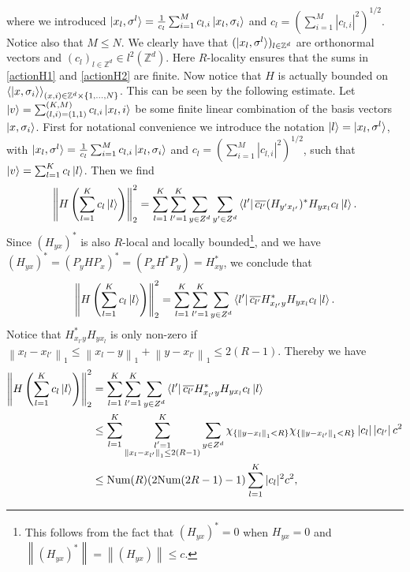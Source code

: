 \documentclass[a4paper,11pt]{article}
\newcommand{\norm}[1]{\left\lVert #1 \right\rVert}
\newcommand{\abs}[1]{\left\lvert #1 \right\rvert}
\newcommand{\Z}{\mathbb{Z}}
\numberwithin{equation}{section}
\begin{document}
 	 where we introduced $ \ket{x_l,\sigma^l}=\frac{1}{c_l}\sum_{i=1}^{M}c_{l,i}\ket{x_l,\sigma_i} $ and $ c_l=(\sum_{i=1}^{M}\abs{c_{l,i}}^2)^{1/2} $. Notice also that $ M\leq N $. We clearly have that $ (\ket{x_l,\sigma^l})_{l\in\Z^d} $ are orthonormal vectors and $ (c_l)_{l\in\Z^d}\in l^2(\Z^d) $. Here $ R $-locality ensures that the sums in \eqref{actionH1} and \eqref{actionH2} are finite. Now notice that $ H $ is actually bounded on $ \braket{\ket{x,\sigma_i}}_{(x,i)\in\Z^d\times\{1,...,N\}}  $. This can be seen by the following estimate. Let $ \ket{v}=\sum_{(l,i)=(1,1)}^{(K,M)}c_{l,i}\ket{x_l,i} $ be some finite linear combination of the basis vectors $ \ket{x,\sigma_i} $. First for notational convenience we introduce the notation $ \ket{l}=\ket{x_l,\sigma^l}$, with $\ket{x_l,\sigma^l}=\frac{1}{c_l}\sum_{i=1}^{M}c_{l,i}\ket{x_l,\sigma_i} $ and $ c_l=(\sum_{i=1}^{M}\abs{c_{l,i}}^2)^{1/2} $, such that $ \ket{v}=\sum_{l=1}^{K}c_l\ket{l} $. Then we find \begin{equation}
 	 \norm{H\left(\sum_{l=1}^{K}c_l\ket{l}\right)}_2^2=\sum_{l=1}^{K}\sum_{l'=1}^{K}\sum_{y\in Z^d}\sum_{y'\in Z^d}\bra{l'}\overline{c_{l'}}(H_{y'x_{l'}})^*H_{yx_l}c_l\ket{l}.
 	 \end{equation}
 	 Since $ (H_{yx})^* $ is also $ R $-local and locally bounded\footnote{This follows from the fact that $ (H_{yx})^*=0 $ when $ H_{yx}=0 $ and $ \norm{(H_{yx})^*}=\norm{(H_{yx})}\leq c $. }, and we have $ (H_{yx})^*=(P_yHP_x)^*=(P_xH^*P_y)=H^*_{xy} $, we conclude that \begin{equation}
 	  \norm{H\left(\sum_{l=1}^{K}c_l\ket{l}\right)}_2^2=\sum_{l=1}^{K}\sum_{l'=1}^{K}\sum_{y\in Z^d}\bra{l'}\overline{c_{l'}}H^*_{x_{l'}y}H_{yx_l}c_l\ket{l}.
 	 \end{equation}
 	 Notice that $ H^*_{x_{l'}y}H_{yx_l} $ is only non-zero if $ \norm{x_l-x_{l'}}_1\leq\norm{x_l-y}_1+\norm{y-x_{l'}}_1\leq2(R-1) $. Thereby we have
 	 \begin{equation}
 	 \begin{aligned}
 	 \norm{H\left(\sum_{l=1}^{K}c_l\ket{l}\right)}_2^2&=\sum_{l=1}^{K}\sum_{l'=1}^{K}\sum_{y\in Z^d}\bra{l'}\overline{c_{l'}}H^*_{x_{l'}y}H_{yx_l}c_l\ket{l}\\&\leq\sum_{l=1}^{K}\sum_{\substack{l'=1\\\norm{x_l-x_{l'}}_1\leq2(R-1)}}^{K}\sum_{y\in Z^d}\chi_{\{\norm{y-x_l}_1<R\}}\chi_{\{\norm{y-x_{l'}}_1<R\}}\abs{c_l}\abs{c_{l'}}c^2\\&\leq \text{Num}(R)(2\text{Num}(2R-1)-1)\sum_{l=1}^{K} |c_l|^2c^2,
 	 \end{aligned}\label{bound1}
 	 \end{equation}
\end{document}
